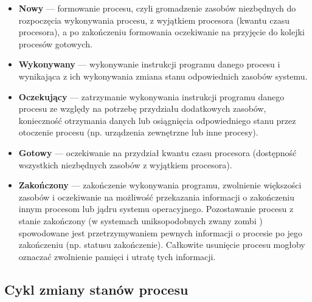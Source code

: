 \documentclass[12pt]{article}
\begin{document}
    \begin{itemize}
        \item \textbf{Nowy} — formowanie procesu, czyli gromadzenie zasobów niezbędnych do rozpoczęcia wykonywania procesu, z wyjątkiem procesora (kwantu czasu procesora), a po zakończeniu formowania oczekiwanie na przyjęcie do kolejki procesów gotowych.
        \item \textbf{Wykonywany} — wykonywanie instrukcji programu danego procesu i wynikająca z ich wykonywania zmiana stanu odpowiednich zasobów systemu.
        \item \textbf{Oczekujący} — zatrzymanie wykonywania instrukcji programu danego procesu ze względy na potrzebę przydziału dodatkowych zasobów, konieczność otrzymania danych lub osiągnięcia odpowiedniego stanu przez otoczenie procesu (np. urządzenia zewnętrzne lub inne procesy).
        \item \textbf{Gotowy} — oczekiwanie na przydział kwantu czasu procesora (dostępność wszystkich niezbędnych zasobów z wyjątkiem procesora).
        \item \textbf{Zakończony} — zakończenie wykonywania programu, zwolnienie większości zasobów i oczekiwanie na możliwość przekazania informacji o zakończeniu innym procesom lub jądru systemu operacyjnego.
        Pozostawanie procesu z stanie zakończony (w systemach uniksopodobnych zwany zombi ) spowodowane jest przetrzymywaniem pewnych informacji o procesie po jego zakończeniu (np. statusu zakończenie). Całkowite usunięcie procesu mogłoby oznaczać zwolnienie pamięci i utratę tych informacji.
    \end{itemize}
    
    \subsection{Cykl zmiany stanów procesu}
    
\end{document}
